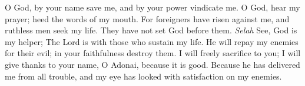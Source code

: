 \begin{biblechapter} %
 O God, by your name save me, 
and by your power vindicate me.
\verse O God, hear my prayer; 
heed the words of my mouth.
\verse For foreigners have risen against me, 
and ruthless men seek my life. 
They have not set God before them. \textit{Selah}
\verse See, God is my helper; 
The Lord is with those who sustain my life.
\verse He will repay my enemies for their evil; 
in your faithfulness destroy them.
\verse I will freely sacrifice to you; 
I will give thanks to your name, 
O Adonai, because it is good.
\verse Because he has delivered me from all trouble, 
and my eye has looked with satisfaction on my enemies.
\end{biblechapter}

